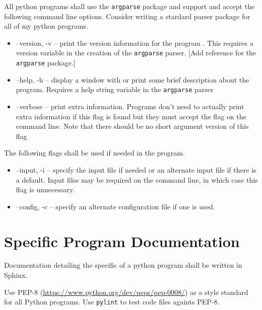 All python programs shall use the \texttt{argparse} package and
support and accept the following command line options. Consider
writing a stardard parser package for all of my python programs.

\begin{itemize}

  \item --version, -v -- print the version information for the program .
   This requires a version variable in the creation of the
   \texttt{argparse} parser.  [Add reference for the \texttt{argparse}
   package.]

  \item --help, -h -- display a window with or print some brief
    description about the program. Requires a help string variable in the 
    \texttt{argparse} parser 

  \item --verbose -- print extra information. Programs don't
    need to actually print extra information if this flag is found but
    they must accept the flag on the command line. Note that 
    there should be no short argument version of this flag
\end{itemize}

The following flags shall be used if needed in the program.

\begin{itemize}
  \item --input, -i -- specify the input file if needed or an alternate
   input file if there is a default. Input files may be required on the
   command line, in which case this flag is unnecessary.

 \item --config, -c -- specify an alternate configuration file if one
   is used.
\end{itemize}


\section{Specific Program Documentation}

Documentation detailing the specific of a python program shall be
written in Sphinx.

Use PEP-8  (\url{https://www.python.org/dev/peps/pep-0008/}) as a
style standard for all Python programs. Use \texttt{pylint} to test
code files againts PEP-8. 


